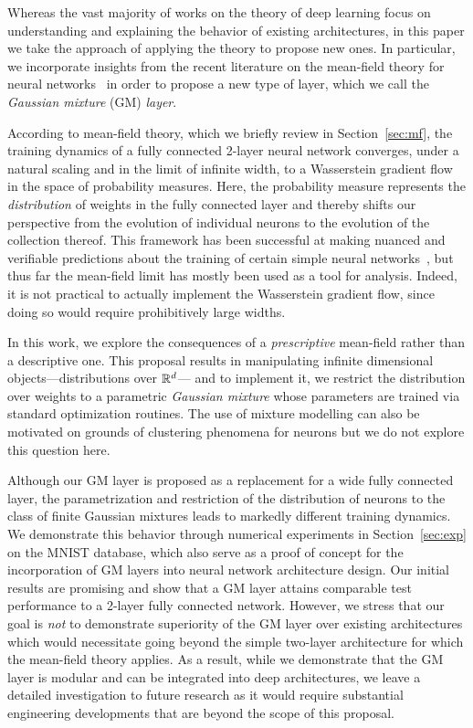 \documentclass{custom}
\begin{document}
Whereas the vast majority of works on the theory of deep learning focus on understanding and explaining the behavior of existing architectures, in this paper we take the approach of applying the theory to propose new ones.
In particular,  we incorporate insights from the recent literature on the mean-field theory for neural networks~\citep{chizat2018global, MeiMonNgu18MeanField, MeiMisMon19MFNN, SirSpi20MeanFieldCLT, Chi22MFLangevin, NitWuSuz22MFLangevin, RotVan22NNInteracting} in order to propose a new type of layer, which we call the \emph{Gaussian mixture} (GM) \emph{layer}.

According to mean-field theory, which we briefly review in Section~\ref{sec:mf}, the training dynamics of a fully connected 2-layer neural network converges, under a natural scaling and in the limit of infinite width, to a Wasserstein gradient flow in the space of probability measures.
Here, the probability measure represents the \emph{distribution} of weights in the fully connected layer and thereby shifts our perspective from the evolution of individual neurons to the evolution of the collection thereof.
This framework has been successful at making nuanced and verifiable predictions about the training of certain simple neural networks~\citep{MeiMonNgu18MeanField, AbbAdsMis23LeapComplexity, BerMonZho24TimeScales}, but thus far the mean-field limit has mostly been used as a tool for analysis.
Indeed, it is not practical to actually implement the Wasserstein gradient flow, since doing so would require prohibitively large widths.

In this work, we explore the consequences of a \emph{prescriptive} mean-field rather than a descriptive one. This proposal results in manipulating infinite dimensional objects---distributions over $\mathbb R^d$--- and to implement it, we restrict the distribution over weights to a parametric \emph{Gaussian mixture} whose parameters are trained via standard optimization routines. The use of mixture modelling can also be motivated on grounds of clustering phenomena for neurons but we do not explore this question here.

Although our GM layer is proposed as a replacement for a wide fully connected layer, the parametrization and restriction of the distribution of neurons to the class of finite Gaussian mixtures leads to markedly different training dynamics.
We demonstrate this behavior through numerical experiments in Section~\ref{sec:exp} on the MNIST database, which also serve as a proof of concept for the incorporation of GM layers into neural network architecture design.
Our initial results are promising and show that a GM layer attains comparable test performance to a 2-layer fully connected network.
However, we stress that our goal is \emph{not} to demonstrate superiority of the GM layer over existing architectures which would necessitate going beyond the simple two-layer architecture for which the mean-field theory applies. As a result, while we demonstrate that the GM layer is modular and can be integrated into deep architectures, we leave a detailed investigation to future research as it would require substantial engineering developments that are beyond the scope of this proposal. 
\end{document}
